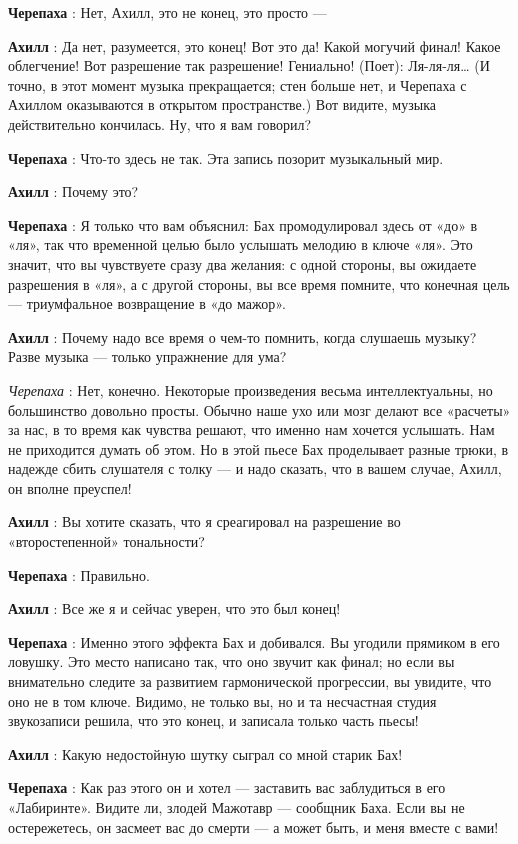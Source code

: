 \textbf{Черепаха} : Нет, Ахилл, это не конец, это просто ---

\textbf{Ахилл} : Да нет, разумеется, это конец! Вот это да! Какой могучий финал! Какое облегчение! Вот разрешение так разрешение! Гениально! (Поет): Ля-ля-ля\ldots{} (И точно, в этот момент музыка прекращается; стен больше нет, и Черепаха с Ахиллом оказываются в открытом пространстве.) Вот видите, музыка действительно кончилась. Ну, что я вам говорил?

\textbf{Черепаха} : Что-то здесь не так. Эта запись позорит музыкальный мир.

\textbf{Ахилл} : Почему это?

\textbf{Черепаха} : Я только что вам объяснил: Бах промодулировал здесь от «до» в «ля», так что временной целью было услышать мелодию в ключе «ля». Это значит, что вы чувствуете сразу два желания: с одной стороны, вы ожидаете разрешения в «ля», а с другой стороны, вы все время помните, что конечная цель --- триумфальное возвращение в «до мажор».

\textbf{Ахилл} : Почему надо все время о чем-то помнить, когда слушаешь музыку? Разве музыка --- только упражнение для ума?

\emph{Черепаха} : Нет, конечно. Некоторые произведения весьма интеллектуальны, но большинство довольно просты. Обычно наше ухо или мозг делают все «расчеты» за нас, в то время как чувства решают, что именно нам хочется услышать. Нам не приходится думать об этом. Но в этой пьесе Бах проделывает разные трюки, в надежде сбить слушателя с толку --- и надо сказать, что в вашем случае, Ахилл, он вполне преуспел!

\textbf{Ахилл} : Вы хотите сказать, что я среагировал на разрешение во «второстепенной» тональности?

\textbf{Черепаха} : Правильно.

\textbf{Ахилл} : Все же я и сейчас уверен, что это был конец!

\textbf{Черепаха} : Именно этого эффекта Бах и добивался. Вы угодили прямиком в его ловушку. Это место написано так, что оно звучит как финал; но если вы внимательно следите за развитием гармонической прогрессии, вы увидите, что оно не в том ключе. Видимо, не только вы, но и та несчастная студия звукозаписи решила, что это конец, и записала только часть пьесы!

\textbf{Ахилл} : Какую недостойную шутку сыграл со мной старик Бах!

\textbf{Черепаха} : Как раз этого он и хотел --- заставить вас заблудиться в его «Лабиринте». Видите ли, злодей Мажотавр --- сообщник Баха. Если вы не остережетесь, он засмеет вас до смерти --- а может быть, и меня вместе с вами!

